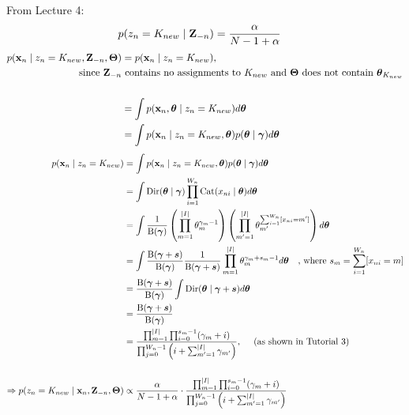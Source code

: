 \begin{enumerate}
    From Lecture 4:
    \begin{align*}
        p(z_n = K_{new} \mid \mathbf{Z}_{-n}) &= \frac{\alpha}{N - 1 + \alpha} 
    \end{align*}
    \begin{align*}
        p(\bold{x}_n \mid z_n = K_{new}, \mathbf{Z}_{-n}, \bold{\Theta}) &= p(\bold{x}_n \mid z_n = K_{new}),
        \\ \text{since }\mathbf{Z}_{-n} &\text{ contains no assignments to $K_{new}$ and $\bold{\Theta}$ does not contain $\boldsymbol{\theta}_{K_{new}}$}
        \\\\
        &= \int p(\bold{x}_n, \boldsymbol{\theta} \mid z_n = K_{new}) d\boldsymbol{\theta}
        \\
        &= \int p(\bold{x}_n \mid z_n = K_{new}, \boldsymbol{\theta}) p(\boldsymbol{\theta} \mid \boldsymbol{\gamma}) d\boldsymbol{\theta}
    \end{align*}
    \begin{align*}
        p(\bold{x}_n \mid z_n = K_{new}) &= \int p(\bold{x}_n \mid z_n = K_{new}, \boldsymbol{\theta}) p(\boldsymbol{\theta} \mid \boldsymbol{\gamma}) d\boldsymbol{\theta}
        \\
        &= \int \operatorname{Dir}(\boldsymbol{\theta}\mid \boldsymbol{\gamma}) \prod_{i=1}^{W_n} \operatorname{Cat}(x_{ni}\mid \boldsymbol{\theta}) d\boldsymbol{\theta}
        \\
        &= \int \frac{1}{\operatorname{B}(\boldsymbol{\gamma})}\left(\prod_{m=1}^{\vert I \vert} \theta_{m}^{\gamma_m - 1}\right) \left( \prod_{m'=1}^{\vert I \vert} \theta_{m'}^{\sum_{i=1}^{W_n}[x_{ni} = m']}\right) d\boldsymbol{\theta}
        \\
        &= \int \frac{\operatorname{B}(\boldsymbol{\gamma} + \boldsymbol{s})}{\operatorname{B}(\boldsymbol{\gamma})} \frac{1}{\operatorname{B}(\boldsymbol{\gamma} + \boldsymbol{s})} \prod_{m=1}^{\vert I \vert} \theta_{m}^{\gamma_m + s_m - 1} d\boldsymbol{\theta} \quad \text{, where } s_m = \sum_{i=1}^{W_n} [x_{ni} = m]
        \\
        &= \frac{\operatorname{B}(\boldsymbol{\gamma} + \boldsymbol{s})}{\operatorname{B}(\boldsymbol{\gamma})} \int \operatorname{Dir}(\boldsymbol{\theta} \mid \boldsymbol{\gamma} + \boldsymbol{s}) d\boldsymbol{\theta}
        \\
        &= \frac{\operatorname{B}(\boldsymbol{\gamma} + \boldsymbol{s})}{\operatorname{B}(\boldsymbol{\gamma})}
        \\
        &= \frac{\prod_{m=1}^{\vert I \vert}\prod_{i=0}^{s_m - 1}(\gamma_m + i)}{\prod_{j=0}^{W_n -1}\left( i + \sum_{m'=1}^{\vert I\vert} \gamma_{m'} \right)} , \quad \text{ (as shown in Tutorial 3) }
        \\\\
        \Rightarrow p(z_n = K_{new} \mid \bold{x}_n, \mathbf{Z}_{-n}, \bold{\Theta}) &\propto \frac{\alpha}{N - 1 + \alpha} \cdot \frac{\prod_{m=1}^{\vert I \vert}\prod_{i=0}^{s_m - 1}(\gamma_m + i)}{\prod_{j=0}^{W_n -1}\left( i + \sum_{m'=1}^{\vert I\vert} \gamma_{m'} \right)}
    \end{align*}
    

\end{enumerate}
